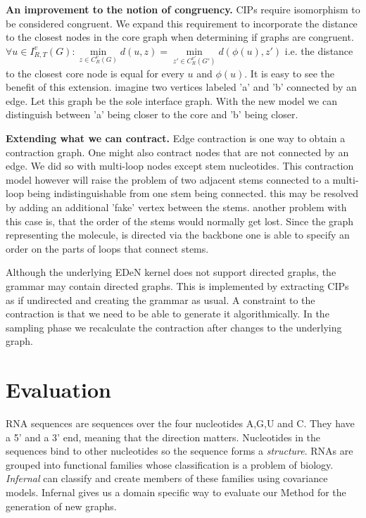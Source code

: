 \documentclass{article}
\begin{document}
\textbf{An improvement to the notion of congruency.}
CIPs require isomorphism to be considered congruent.
We expand this requirement to incorporate
the distance to the closest nodes in the core graph when 
determining if graphs are congruent.
$\forall u \in I_{R,T}^v(G) : 
\underset{z \in  C_{R}^v(G)}{\min} d(u,z) = 
\underset{z' \in  C_{R}^{v'}(G')}{\min} d(\phi(u),z') $ i.e. the distance 
to the closest core node is equal for every
$u$ and $\phi(u)$.
It is easy to see the benefit of this extension.
imagine two vertices labeled 'a' and 'b' connected by an edge. Let this graph
be the sole interface graph. With the new model we can distinguish 
between 'a' being closer to the core and 'b' being closer. 

\textbf{Extending what we can contract.}
Edge contraction is one way to obtain a contraction graph. 
One might also contract nodes that are not connected by an edge.
We did so with multi-loop nodes except stem nucleotides.
This contraction model however will raise the problem 
of two adjacent stems connected to a multi-loop being
indistinguishable from one stem being connected.
this may be resolved by adding an additional 'fake' vertex 
between the stems. another problem with 
this case is, that the order of the stems would normally get lost.
Since the graph representing the molecule, is directed via 
the backbone one is able to specify an order on the
parts of loops that connect stems.

Although the underlying EDeN kernel does not support directed graphs,
the grammar may contain directed graphs. This is implemented by extracting
CIPs as if undirected and creating the grammar as usual.
A constraint to the contraction is that we need to be able to 
generate it algorithmically. In the sampling phase we recalculate 
the contraction after changes to the underlying graph.


\section{Evaluation}
RNA sequences are sequences over the four nucleotides A,G,U and C.
They have a 5' and a 3' end, meaning that the direction matters.
Nucleotides in the sequences bind to other nucleotides so
the sequence forms a \emph{structure}.
RNAs are grouped into functional families whose classification
is a problem of biology. \emph{Infernal}\cite{infernal} can classify and 
create members of these families using covariance models.
Infernal gives us a domain specific way to evaluate
our Method for the generation of new graphs. 
\end{document}
